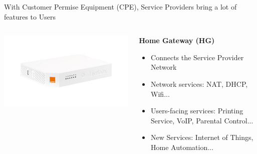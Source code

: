 \documentclass[a4paper]{beamer}
\begin{document}
\begin{frame}{With Customer Permise Equipment (CPE), Service Providers bring a lot of features to Users}
										
									
	\begin{columns}[T] 
		\begin{column}[T]{0.25 \textwidth} 
			\includegraphics[width=\linewidth]{livebox.png}
		\end{column}
																						
		\begin{column}[T]{0.75 \textwidth} %
																																	
			\textbf{Home Gateway  (HG)}
			\begin{itemize}
				\item Connects the Service Provider Network 
				\item Network services: NAT, DHCP, Wifi...
				\item Users-facing services: Printing Service, VoIP, Parental Control...
				\item New Services: Internet of Things, Home Automation...
			\end{itemize}
			\vspace{1em}
																																	
		\end{column}
																						
	\end{columns}
										
										
											

\end{frame}
\end{document}
